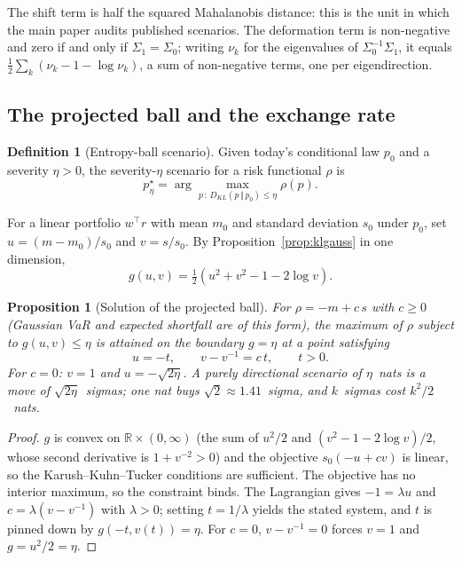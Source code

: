 \documentclass[11pt]{article}
\newtheorem{proposition}{Proposition}
\theoremstyle{definition}
\newtheorem{definition}{Definition}
\theoremstyle{remark}
\newcommand{\KL}[2]{D_{KL}\!\left(#1\,\Vert\,#2\right)}
\begin{document}
The shift term is half the squared Mahalanobis distance: this is the unit in
which the main paper audits published scenarios. The deformation term is
non-negative and zero if and only if $\Sigma_1=\Sigma_0$; writing $\nu_k$ for
the eigenvalues of $\Sigma_0^{-1}\Sigma_1$, it equals
$\tfrac12\sum_k(\nu_k-1-\log\nu_k)$, a sum of non-negative terms, one per
eigendirection.

\subsection{The projected ball and the exchange rate}

\begin{definition}[Entropy-ball scenario]
Given today's conditional law $p_0$ and a severity $\eta>0$, the severity-$\eta$
scenario for a risk functional $\rho$ is
\begin{equation}
\label{eq:ball}
p^\star_\eta=\arg\max_{p\,:\,\KL{p}{p_0}\le\eta}\rho(p).
\end{equation}
\end{definition}

For a linear portfolio $w^\top r$ with mean $m_0$ and standard deviation $s_0$
under $p_0$, set $u=(m-m_0)/s_0$ and $v=s/s_0$. By
Proposition~\ref{prop:klgauss} in one dimension,
\begin{equation}
\label{eq:g}
g(u,v)=\tfrac12\left(u^2+v^2-1-2\log v\right).
\end{equation}

\begin{proposition}[Solution of the projected ball]
\label{prop:ballsol}
For $\rho=-m+c\,s$ with $c\ge0$ (Gaussian VaR and expected shortfall are of this
form), the maximum of $\rho$ subject to $g(u,v)\le\eta$ is attained on the
boundary $g=\eta$ at a point satisfying
\begin{equation*}
u=-t,\qquad v-v^{-1}=c\,t,\qquad t>0 .
\end{equation*}
For $c=0$: $v=1$ and $u=-\sqrt{2\eta}$. \emph{A purely directional scenario of
$\eta$~nats is a move of $\sqrt{2\eta}$~sigmas}; one nat buys
$\sqrt2\approx1.41$~sigma, and $k$~sigmas cost $k^2/2$~nats.
\end{proposition}

\begin{proof}
$g$ is convex on $\mathbb R\times(0,\infty)$ (the sum of $u^2/2$ and
$(v^2-1-2\log v)/2$, whose second derivative is $1+v^{-2}>0$) and the objective
$s_0(-u+cv)$ is linear, so the Karush--Kuhn--Tucker conditions are sufficient.
The objective has no interior maximum, so the constraint binds. The Lagrangian
gives $-1=\lambda u$ and $c=\lambda(v-v^{-1})$ with $\lambda>0$; setting
$t=1/\lambda$ yields the stated system, and $t$ is pinned down by
$g(-t,v(t))=\eta$. For $c=0$, $v-v^{-1}=0$ forces $v=1$ and $g=u^2/2=\eta$.
\end{proof}
\end{document}
